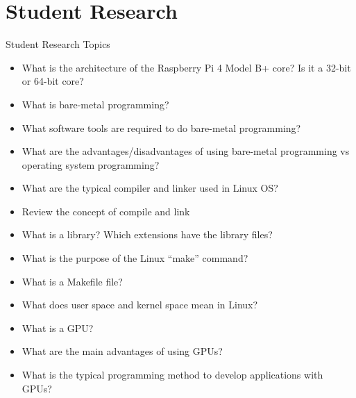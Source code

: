 \section{Student Research}
\begin{frame}{Student Research Topics}
 \begin{itemize}
    \item What is the architecture of the Raspberry Pi 4 Model B+ core? Is it a 32-bit or 64-bit core?
    \item What is bare-metal programming?
    \item What software tools are required to do bare-metal programming?
    \item What are the advantages/disadvantages of using bare-metal programming vs operating system programming?
    \item What are the typical compiler and linker used in Linux OS?
    \item Review the concept of compile and link
    \item What is a library? Which extensions have the library files?
    \item What is the purpose of the Linux “make” command?
    \item What is a Makefile file?
    \item What does user space and kernel space mean in Linux?
    \item What is a GPU?
    \item What are the main advantages of using GPUs?
    \item What is the typical programming method to develop applications with GPUs?
\end{itemize}
\end{frame}